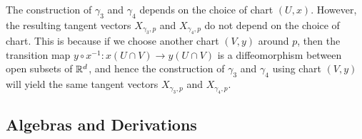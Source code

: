 \begin{remark}
    The construction of \(\gamma_3\) and \(\gamma_4\) depends on the choice of chart \((U, x)\). However, the resulting tangent vectors \(X_{\gamma_3, p}\) and \(X_{\gamma_4, p}\) do not depend on the choice of chart. This is because if we choose another chart \((V, y)\) around \(p\), then the transition map \(y \circ x^{-1}: x(U \cap V) \to y(U \cap V)\) is a diffeomorphism between open subsets of \(\mathbb R^d\), and hence the construction of \(\gamma_3\) and \(\gamma_4\) using chart \((V, y)\) will yield the same tangent vectors \(X_{\gamma_3, p}\) and \(X_{\gamma_4, p}\).
\end{remark}

\subsection{Algebras and Derivations}


